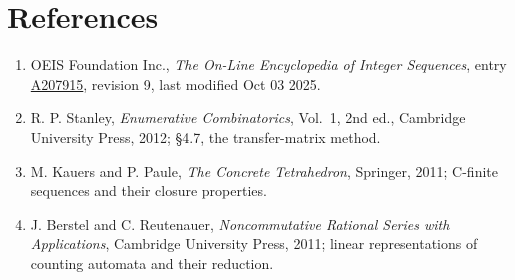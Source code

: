\documentclass[11pt]{article}
\theoremstyle{definition}
\begin{document}
\section{References}

\begin{enumerate}

\item OEIS Foundation Inc., \emph{The On-Line Encyclopedia of Integer Sequences}, entry \href{https://oeis.org/A207915}{A207915}, revision 9, last modified Oct 03 2025.

\item R. P. Stanley, \emph{Enumerative Combinatorics}, Vol.~1, 2nd ed., Cambridge University Press, 2012; \S4.7, the transfer-matrix method.

\item M. Kauers and P. Paule, \emph{The Concrete Tetrahedron}, Springer, 2011; C-finite sequences and their closure properties.

\item J. Berstel and C. Reutenauer, \emph{Noncommutative Rational Series with Applications}, Cambridge University Press, 2011; linear representations of counting automata and their reduction.

\end{enumerate}
\end{document}
